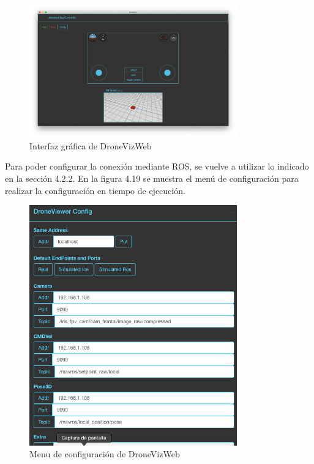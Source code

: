 \begin{figure}[H]
  \begin{center}
    \includegraphics[width=0.8\textwidth]{figures/interfazdroneviz.png}
		\caption{Interfaz gráfica de DroneVizWeb}
		\label{fig.iterfazdroneviz}
		\end{center}
\end{figure}

Para poder configurar la conexión mediante ROS, se vuelve a utilizar lo indicado en la sección 4.2.2. En la figura 4.19 se muestra el menú de configuración para realizar la configuración en tiempo de ejecución.

\begin{figure}[H]
  \begin{center}
    \includegraphics[width=0.8\textwidth]{figures/configdroneviz.png}
		\caption{Menu de configuración de DroneVizWeb}
		\label{fig.configdroneviz}
		\end{center}
\end{figure}

